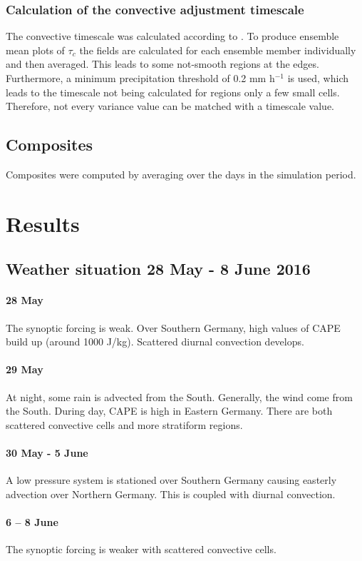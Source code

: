 \documentclass[a4paper, 12pt]{article}
\begin{document}
\subsubsection{Calculation of the convective adjustment timescale}
The convective timescale was calculated according to \cite{Flack2016}. To produce ensemble mean plots of $\tau_c$ the fields are calculated for each ensemble member individually and then averaged. This leads to some not-smooth regions at the edges. Furthermore, a minimum precipitation threshold of 0.2 mm h$^{-1}$ is used, which leads to the timescale not being calculated for regions only a few small cells. Therefore, not every variance value can be matched with a timescale value. 

\subsection{Composites}
Composites were computed by averaging over the days in the simulation period. 

\section{Results}

\subsection{Weather situation 28 May - 8 June 2016}
\paragraph{28 May} The synoptic forcing is weak. Over Southern Germany, high values of CAPE build up (around 1000 J/kg). Scattered diurnal convection develops.
\paragraph{29 May} At night, some rain is advected from the South. Generally, the wind come from the South. During day, CAPE is high in Eastern Germany. There are both scattered convective cells and more stratiform regions.
\paragraph{30 May - 5 June} A low pressure system is stationed over Southern Germany causing easterly advection over Northern Germany. This is coupled with diurnal convection.
\paragraph{6 -- 8 June} The synoptic forcing is weaker with scattered convective cells.
\end{document}
